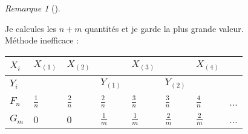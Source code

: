 \documentclass{article}
\theoremstyle{plain}%
\theoremstyle{definition}
\theoremstyle{remark}
\newtheorem*{rem}{Remarque}
\begin{document}
\begin{rem}[]
\begin{enumerate}
            Je calcules les $ n+m $ quantités et je garde la plus grande valeur. \\
            Méthode inefficace : 
            \begin{table}[!h]
                \centering
                \begin{tabular}{|l|l|l|l|l|l|l|l|}
                \hline
                    $ X_i $  & $ X_{(1)} $ & $ X_{(2)} $ & ~ & $ X_{(3)} $ & ~ & $ X_{(4)} $ & ~ \\ \hline
                    $ Y_i $  & ~ & ~ & $ Y_{(1)} $ & ~ & $ Y_{(2)} $ & ~ & ~ \\ \hline
                    $ F_n $  & $ \frac{1}{n} $  & $ \frac{2}{n} $  & $ \frac{2}{n} $  & $ \frac{3}{n} $  & $ \frac{3}{n} $  & $ \frac{4}{n} $  & ... \\ \hline
                    $ G_m $  & 0 & 0 & $ \frac{1}{m} $  & $ \frac{1}{m} $  & $ \frac{2}{m} $  & $ \frac{2}{m} $  & ... \\ \hline
                \end{tabular}
            \end{table}

    \end{enumerate}
\end{rem}
\end{document}
